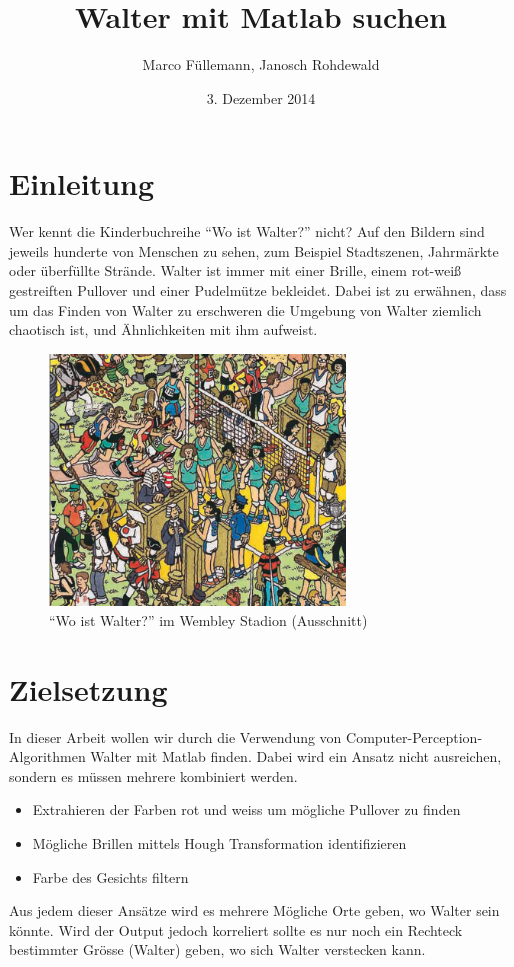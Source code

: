 \documentclass[paper=a4,fontsize=12pt]{scrartcl}
\begin{document}
\title{Walter mit Matlab suchen}
\author{Marco Füllemann, Janosch Rohdewald}
\date{3. Dezember 2014}
\maketitle
\section*{Einleitung}
Wer kennt die Kinderbuchreihe ``Wo ist Walter?'' nicht? Auf den Bildern sind jeweils hunderte von Menschen zu sehen, zum Beispiel Stadtszenen, Jahrmärkte oder überfüllte Strände. Walter ist immer mit einer Brille, einem rot-weiß gestreiften Pullover und einer Pudelmütze bekleidet. Dabei ist zu erwähnen, dass um das Finden von Walter zu erschweren die Umgebung von Walter ziemlich chaotisch ist, und Ähnlichkeiten mit ihm aufweist.

\begin{figure}[htbp] 
  \centering
     \includegraphics[width=0.7\textwidth]{img/WallyWembleyCropped.png}
  \caption{``Wo ist Walter?'' im Wembley Stadion (Ausschnitt)}
  \label{fig:Bild1}
\end{figure}
\section*{Zielsetzung}
In dieser Arbeit wollen wir durch die Verwendung von Computer-Perception-Algorithmen Walter mit Matlab finden. Dabei wird ein Ansatz nicht ausreichen, sondern es müssen mehrere kombiniert werden.
\begin{itemize}
 \item Extrahieren der Farben rot und weiss um mögliche Pullover zu finden
 \item Mögliche Brillen mittels Hough Transformation identifizieren
 \item Farbe des Gesichts filtern
\end{itemize}
Aus jedem dieser Ansätze wird es mehrere Mögliche Orte geben, wo Walter sein könnte. Wird der Output jedoch korreliert sollte es nur noch ein Rechteck bestimmter Grösse (Walter) geben, wo sich Walter verstecken kann. 
\end{document}

